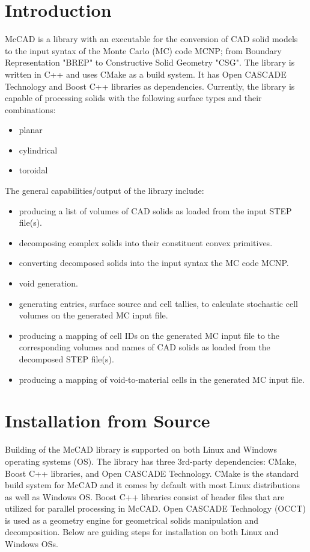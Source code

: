 \documentclass[12pt, a4paper, titlepage]{article}
\begin{document}
\section{Introduction} \label{sec:Introduction}
McCAD is a library with an executable for the conversion of CAD solid models to the input syntax of the Monte Carlo (MC) code MCNP; from Boundary Representation "BREP" to Constructive Solid Geometry "CSG". The library is written in C++ and uses CMake as a build system. It has Open CASCADE Technology and Boost C++ libraries as dependencies. Currently, the library is capable of processing solids with the following surface types and their combinations:
\begin{itemize}
	\item planar
	\item cylindrical
	\item toroidal
\end{itemize}
The general capabilities/output of the library include:
\begin{itemize}
	\item producing a list of volumes of CAD solids as loaded from the input STEP file(s).
	\item decomposing complex solids into their constituent convex primitives.
	\item converting decomposed solids into the input syntax the MC code MCNP.
	\item void generation.
	\item generating entries, surface source and cell tallies, to calculate stochastic cell volumes on the generated MC input file.
	\item producing a mapping of cell IDs on the generated MC input file to the corresponding volumes and names of CAD solids as loaded from the decomposed STEP file(s).
	\item producing a mapping of void-to-material cells in the generated MC input file.
\end{itemize}

\section{Installation from Source} \label{sec:Installation from Source}
Building of the McCAD library is supported on both Linux and Windows operating systems (OS). The library has three 3rd-party dependencies: CMake, Boost C++ libraries, and Open CASCADE Technology. CMake is the standard build system for McCAD and it comes by default with most Linux distributions as well as Windows OS. Boost C++ libraries consist of header files that are utilized for parallel processing in McCAD. Open CASCADE Technology (OCCT) is used as a geometry engine for geometrical solids manipulation and decomposition. Below are guiding steps for installation on both Linux and Windows OSs. 
\end{document}
